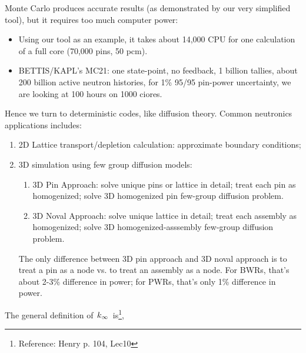 \documentclass{school-22.211-notes}
\date{March 14, 2012}
\begin{document}
\maketitle

 \label{intro-to-diffusion-theory}
Monte Carlo produces accurate results (as demonstrated by our very simplified tool), but it requires too much computer power:
\begin{itemize}
\item Using our tool as an example, it takes about 14,000 CPU for one calculation of a full core (70,000 pins, 50 pcm). 
\item BETTIS/KAPL's MC21: one state-point, no feedback, 1 billion tallies, about 200 billion active neutron histories, for 1\% 95/95 pin-power uncertainty, we are looking at 100 hours on 1000 ciores. 
\end{itemize}

Hence we turn to deterministic codes, like diffusion theory. Common neutronics applications includes: 
\begin{enumerate}
\item 2D Lattice transport/depletion calculation: approximate boundary conditions;
\item 3D simulation using few group diffusion models: 
  \begin{enumerate}
  \item 3D Pin Approach: solve unique pins or lattice in detail; treat each pin as homogenized; solve 3D homogenized pin few-group diffusion problem. 

  \item 3D Noval Approach: solve unique lattice in detail; treat each assembly as homogenized; solve 3D homogenized-asssembly few-group diffusion problem. 
  \end{enumerate}
  The only difference between 3D pin approach and 3D noval approach is to treat a pin as a node vs. to treat an assembly as a node. For BWRs, that's about 2-3\% difference in power; for PWRs, that's only 1\% difference in power. 
\end{enumerate}


\clearpage
{}
The general definition of $\left. k_{\infty} \right.$ is\footnote{Reference: Henry p. 104, Lec10},
\end{document}
